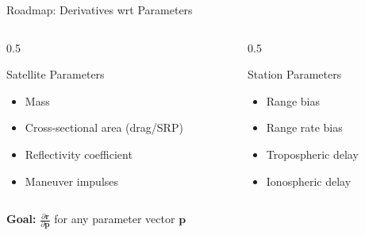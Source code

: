 \documentclass[aspectratio=169,12pt]{beamer}
\begin{document}
\begin{frame}{Roadmap: Derivatives wrt Parameters}
    \begin{columns}
        \begin{column}{0.5\textwidth}
            \begin{block}{Satellite Parameters}
                \begin{itemize}
                    \item Mass
                    \item Cross-sectional area (drag/SRP)
                    \item Reflectivity coefficient
                    \item Maneuver impulses
                \end{itemize}
            \end{block}
        \end{column}
        \begin{column}{0.5\textwidth}
            \begin{alertblock}{Station Parameters}
                \begin{itemize}
                    \item Range bias
                    \item Range rate bias
                    \item Tropospheric delay
                    \item Ionospheric delay
                \end{itemize}
            \end{alertblock}
        \end{column}
    \end{columns}
    
    \vspace{0.5cm}
    \begin{center}
        \textbf{Goal:} $\frac{\partial \mathbf{r}}{\partial \mathbf{p}}$ for any parameter vector $\mathbf{p}$
    \end{center}
\end{frame}
\end{document}
